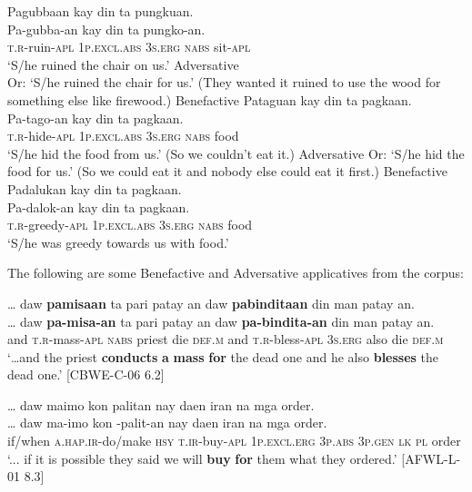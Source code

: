 \ea
Pagubbaan  kay  din  ta  pungkuan. \\\smallskip
\gll Pa-gubba-an  kay  din  ta  pungko-an. \\
\textsc{t.r}-ruin-\textsc{apl}  1\textsc{p.excl.abs}  3\textsc{s.erg}  \textsc{nabs}  sit-\textsc{apl} \\
\glt ‘S/he ruined the chair on us.’ Adversative \\
Or: ‘S/he ruined the chair for us.’ (They wanted it ruined to use the wood for something else like firewood.) Benefactive
\z
\ea
Pataguan  kay  din  ta  pagkaan. \\\smallskip
\gll Pa-tago-an  kay  din  ta  pagkaan. \\
\textsc{t.r}-hide-\textsc{apl}  1\textsc{p.excl.abs}  3\textsc{s.erg}  \textsc{nabs}  food \\
\glt ‘S/he hid the food from us.’ (So we couldn’t eat it.) Adversative
Or: ‘S/he hid the food for us.’ (So we could eat it and nobody else could eat it first.) Benefactive
\z
\ea
Padalukan  kay  din  ta  pagkaan. \\\smallskip
\gll Pa-dalok-an  kay  din  ta  pagkaan. \\
\textsc{t.r}-greedy-\textsc{apl}  1\textsc{p.excl.abs}  3\textsc{s.erg}  \textsc{nabs} food\textsc{} \\
\glt ‘S/he was greedy towards us with food.’
\z

The following are some Benefactive and Adversative applicatives from the corpus:

\ea
… daw  \textbf{pamisaan}  ta  pari  patay  an  daw  \textbf{pabinditaan} din  man  patay  an. \\\smallskip
\gll … daw  \textbf{pa-misa-an}  ta  pari  patay  an  daw  \textbf{pa-bindita-an} din  man  patay  an. \\
{} and  \textsc{t.r}-mass-\textsc{apl}  \textsc{nabs}  priest  die  \textsc{def.m}  and \textsc{t.r}-bless-\textsc{apl} 3\textsc{s.erg}  also  die  \textsc{def.m} \\
\glt `…and the priest \textbf{conducts} \textbf{a} \textbf{mass} \textbf{for} the dead one and he also \textbf{blesses} the dead one.’ [CBWE-C-06 6.2]
\z

\ea
… daw  maimo  kon  palitan  nay  daen  iran  na mga  order. \\\smallskip
\gll … daw  ma-imo  kon  \emptyset{}-palit-an  nay  daen  iran  na mga  order. \\
{}   if/when  \textsc{a.hap.ir}-do/make  \textsc{hsy}  \textsc{t.ir}-buy-\textsc{apl}  1\textsc{p.excl.erg}  3\textsc{p.abs}  3\textsc{p.gen}  \textsc{lk} \textsc{pl}  order \\
\glt ‘... if it is possible they said we will \textbf{buy} \textbf{for} them what they ordered.’ [AFWL-L-01 8.3]
\z

